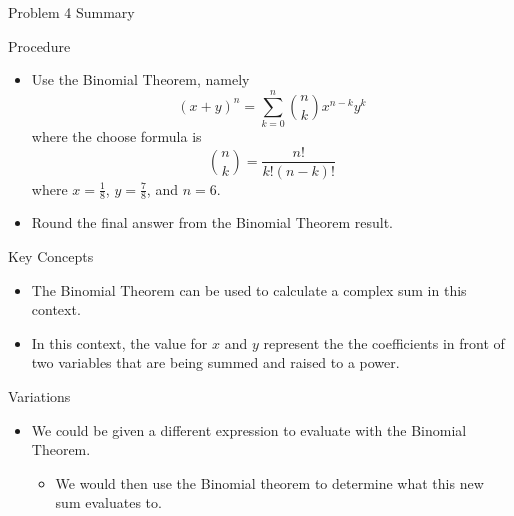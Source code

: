 \begin{summary}{Problem 4 Summary}
    \begin{statement}{Procedure}
        \begin{itemize}
            \item Use the Binomial Theorem, namely
            \begin{equation*}
                (x + y)^{n} = \sum_{k = 0}^{n} {n \choose k}x^{n - k}y^{k}
            \end{equation*}
            where the choose formula is 
            \begin{equation*}
                {n \choose k} = \frac{n!}{k!(n - k)!}
            \end{equation*}
            where $x = \frac{1}{8}$, $y = \frac{7}{8}$, and $n = 6$.
            \item Round the final answer from the Binomial Theorem result.
        \end{itemize}
    \end{statement}
    \begin{statement}{Key Concepts}
        \begin{itemize}
            \item The Binomial Theorem can be used to calculate a complex sum in this context.
            \item In this context, the value for $x$ and $y$ represent the the coefficients in front of two variables that are being summed and raised to a power.
        \end{itemize}
    \end{statement}
    \begin{statement}{Variations}
        \begin{itemize}
            \item We could be given a different expression to evaluate with the Binomial Theorem.
            \begin{itemize}
                \item We would then use the Binomial theorem to determine what this new sum evaluates to.
            \end{itemize}
        \end{itemize}
    \end{statement}
\end{summary}

